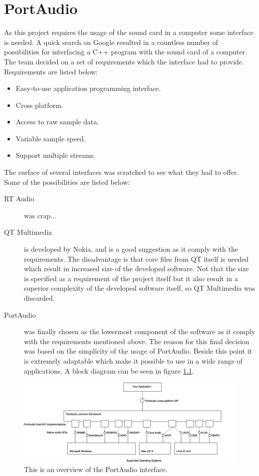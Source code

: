 \chapter{PortAudio}\label{chap:lib}\label{app:portaudio}
As this project requires the usage of the sound card in a computer some interface is needed. A quick search on Google resulted in a countless number of possibilities for interfacing a C++ program with the sound card of a computer. The team decided on a set of requirements which the interface had to provide. Requirements are listed below:

\begin{itemize}
\item Easy-to-use application programming interface.
\item Cross platform.
\item Access to raw sample data.
\item Variable sample speed.
\item Support multiple streams.
\end{itemize}

The surface of several interfaces was scratched to see what they had to offer. Some of the possibilities are listed below:

\begin{description}
 \item[RT Audio\footnotemark] was crap...
 \item[QT Multimedia\footnotemark] is developed by Nokia, and is a good suggestion as it comply with the requirements. The disadvantage is that core files from QT itself is needed which result in increased size of the developed software. Not that the size is specified as a requirement of the project itself but it also result in a superior complexity of the developed software itself, so QT Multimedia was discarded.
 \item[PortAudio\footnotemark] was finally chosen as the lowermost component of the software as it comply with the requirements mentioned above.  The reason for this final decision was based on the simplicity of the usage of PortAudio. Beside this point it is extremely adaptable which make it possible to use in a wide range of applications. A block diagram can be seen in figure \ref{fig:app_portaudio}.
\end{description}

\begin{figure}[htb]
	\begin{center}
	\includegraphics[scale=0.44,trim=0 0 0 0]{content/graphics/appendix/portaudio_architecture.png}%
	\caption{This is an overview of the PortAudio interface.}
	\label{fig:app_portaudio}
	\end{center}
\end{figure}


